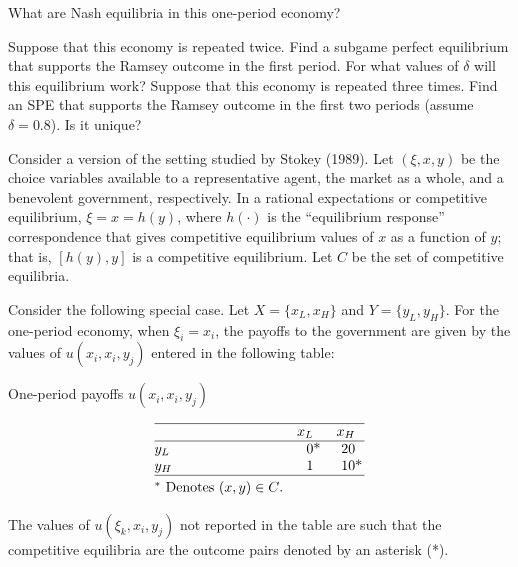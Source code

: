 \medskip
{}  What are  Nash equilibria in this one-period economy?

\smallskip
{}  Suppose that this economy is repeated twice.  Find a
subgame perfect equilibrium that supports the Ramsey outcome
in the first period.  For what values of $\delta$ will this
equilibrium work?
\smallskip
{}  Suppose that this economy is repeated three times.
Find an SPE that supports the Ramsey
outcome in the first two periods (assume $\delta = 0.8$).  Is it unique?

\medskip

 \quad
  Consider a version of the setting studied by Stokey (1989). Let
$(\xi, x, y)$
be the choice variables available to a representative agent, the
market as a whole, and a benevolent government, respectively.  In a
rational expectations or competitive equilibrium, $\xi = x = h(y)$, where
$h(\cdot)$ is the ``equilibrium response'' correspondence that
gives competitive equilibrium values of $x$ as a function of
$y$; that is, $[h(y),y]$ is a competitive equilibrium.  Let $C$ be
the set of competitive equilibria.

Consider the following special case.  Let $X= \{x_L,x_H\}$ and
$Y = \{y_L,y_H\}$. For the one-period economy,
when $\xi_i = x_i$, the payoffs to the government
 are given by the values of $u(x_i,x_i,y_j)$ entered in
the following table:

\smallskip

\centerline{One-period payoffs $u(x_i,x_i,y_j)$}
$$\vbox{\offinterlineskip
\hrule
\halign{\strut #\hfil &\quad \hfil# &\quad \hfil# \cr
& $x_L$ & $x_H$ \cr \noalign{\hrule}
$y_L$ & $0\rlap{*}$ & $20$ \cr
$y_H$ & 1 & $10\rlap{*}$ \cr \noalign{\hrule}
\noalign{\smallskip}
\hbox{$^\ast$ Denotes $(x,y)\in C$.}\cr
              }}$$

\smallskip\noindent
The values of $u(\xi_k,x_i,y_j)$ not reported in the table
are such that the competitive equilibria are the outcome pairs
denoted by an asterisk (*).

